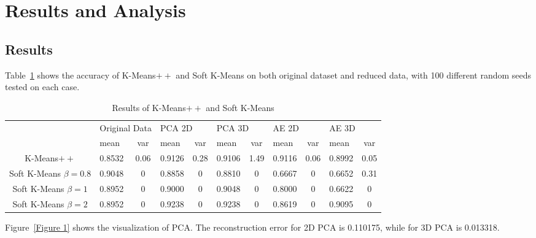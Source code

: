 \documentclass{article}
\begin{document}
\section{Results and Analysis}
\subsection{Results}
Table~\ref{Table 1} shows the accuracy of K-Means$++$ and Soft K-Means on both original dataset and reduced data, with 100 different random seeds tested on each case.
\begin{table}[H]
    \centering
    \begin{tabular}{|c|cc|cc|cc|cc|cc|}\hline
    \multirow{2}{*}{}       &\multicolumn{2}{l|}{Original Data}&\multicolumn{2}{l|}{PCA 2D}& \multicolumn{2}{l|}{PCA 3D}    & \multicolumn{2}{l|}{AE 2D}    & \multicolumn{2}{l|}{AE 3D}    \\ \cline{2-11} 
                            &\multicolumn{1}{l|}{mean}   &var  &\multicolumn{1}{l|}{mean}  &var   & \multicolumn{1}{l|}{mean}  &var  &\multicolumn{1}{l|}{mean}  &var &\multicolumn{1}{l|}{mean}  &var \\ \hline
    K-Means$++$             &\multicolumn{1}{l|}{0.8532} &0.06 &\multicolumn{1}{l|}{0.9126}&0.28  & \multicolumn{1}{l|}{0.9106}&1.49 &\multicolumn{1}{l|}{0.9116}&0.06&\multicolumn{1}{l|}{0.8992}&0.05\\ \hline
    Soft K-Means $\beta=0.8$&\multicolumn{1}{l|}{0.9048} &0    &\multicolumn{1}{l|}{0.8858}&0     & \multicolumn{1}{l|}{0.8810}&0    &\multicolumn{1}{l|}{0.6667}&0   &\multicolumn{1}{l|}{0.6652}&0.31\\ \hline
    Soft K-Means $\beta=1$  &\multicolumn{1}{l|}{0.8952} &0    &\multicolumn{1}{l|}{0.9000}&0     & \multicolumn{1}{l|}{0.9048}&0    &\multicolumn{1}{l|}{0.8000}&0   &\multicolumn{1}{l|}{0.6622}&0   \\ \hline    
    Soft K-Means $\beta=2$  &\multicolumn{1}{l|}{0.8952} &0    &\multicolumn{1}{l|}{0.9238}&0     & \multicolumn{1}{l|}{0.9238}&0    &\multicolumn{1}{l|}{0.8619}&0   &\multicolumn{1}{l|}{0.9095}&0   \\ \hline
    \end{tabular}
    \caption{Results of K-Means$++$ and Soft K-Means}
    \label{Table 1}
\end{table}

Figure~\ref{Figure 1} shows the visualization of PCA. The reconstruction error for 2D PCA is 0.110175, while for 3D PCA is 0.013318.
\end{document}
